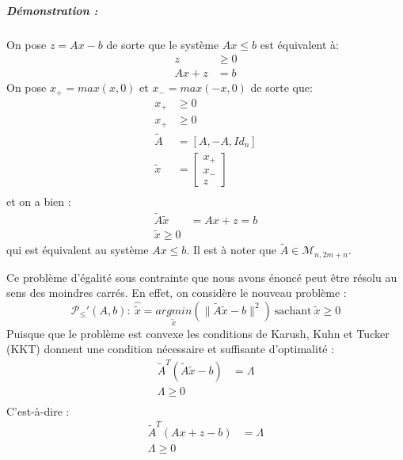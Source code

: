 \documentclass[10pt,a4paper]{article}
\begin{document}
\subparagraph{Démonstration :}
On pose $z = Ax -b$ de sorte que le système $Ax \leq b$ est équivalent à:
\begin{equation}
\begin{aligned}
  z &\geq 0 \\
  Ax + z &= b
\end{aligned}
\end{equation}
On pose $x_+ = max(x, 0)$ et $x_- = max(-x, 0)$ de sorte que:
\begin{equation}
\begin{aligned}
  x_+ &\geq 0 \\
  x_+ &\geq 0 \\
  \tilde{A} &= \left[ A, -A, Id_n \right]\\
  \tilde{x} &= \left[ \begin{array}{c} x_+ \\ x_- \\ z \end{array} \right]\\
  \end{aligned}
\end{equation}
et on a bien :
\begin{equation}
\begin{aligned}
  \tilde{A}\tilde{x} &= Ax + z = b\\
  \tilde{x} \geq 0
  \end{aligned}
\end{equation}
qui est équivalent au système $Ax \leq b$. Il est à noter que $\tilde{A} \in \mathcal{M}_{n,2m+n}$.

Ce problème d'égalité sous contrainte que nous avons énoncé peut être résolu au sens des moindres carrés. En effet, on considère le nouveau problème :
\begin{equation}
\mathcal{P}_{\le}'(A,b): \ \hat{\tilde{x}}=\underset{\tilde{x}}{argmin}( \|\tilde{A}\tilde{x} -b \|^2) \ \text{sachant} \ \tilde{x}\ge 0
\end{equation} 
Puisque que le problème est convexe les conditions de Karush, Kuhn et Tucker (KKT) donnent une condition nécessaire et suffisante d'optimalité :
\begin{equation}
\begin{aligned}
  \tilde{A}^T \left( \tilde{A}\tilde{x} - b \right) &= \Lambda\\
  \Lambda \geq 0\\
\end{aligned}
\end{equation}
C'est-à-dire :
\begin{equation}
\begin{aligned}
  \tilde{A}^T \left(Ax + z - b \right) &= \Lambda\\
  \Lambda \geq 0\\
  \end{aligned}
\end{equation}
\end{document}
